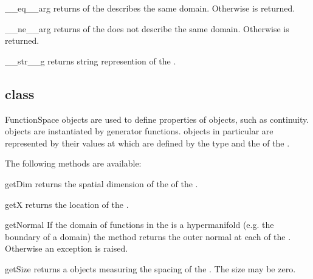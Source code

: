 \begin{methoddesc}[Domain]{__eq__}{arg}
returns \True of the \Domain {} describes the same domain. Otherwise
\False is returned.
\end{methoddesc}

\begin{methoddesc}[Domain]{__ne__}{arg}
returns \True of the \Domain {} does not describe the same domain. 
Otherwise \False is returned.
\end{methoddesc}

\begin{methoddesc}[Domain]{__str__}{g}
returns string represention of the \Domain.
\end{methoddesc}

\subsection{\FunctionSpace class}
\begin{classdesc}{FunctionSpace}{}
\FunctionSpace objects are used to define properties of \Data objects, such as continuity. \FunctionSpace objects
are instantiated by generator functions. \Data objects in particular \FunctionSpace are
represented by their values at \DataSamplePoints which are defined by the type and the \Domain of the
\FunctionSpace.
\end{classdesc}
The following methods are available:
\begin{methoddesc}[FunctionSpace]{getDim}{}
returns the spatial dimension of the \Domain of the \FunctionSpace.
\end{methoddesc}



\begin{methoddesc}[FunctionSpace]{getX}{}
returns the location of the \DataSamplePoints.
\end{methoddesc}

\begin{methoddesc}[FunctionSpace]{getNormal}{}
If the domain of functions in the \FunctionSpace 
is a hypermanifold (e.g. the boundary of a domain)
the method returns the outer normal at each of the 
\DataSamplePoints. Otherwise an exception is raised.
\end{methoddesc}

\begin{methoddesc}[FunctionSpace]{getSize}{}
returns a \Data objects measuring the spacing of the \DataSamplePoints.  
The size may be zero.
\end{methoddesc}

